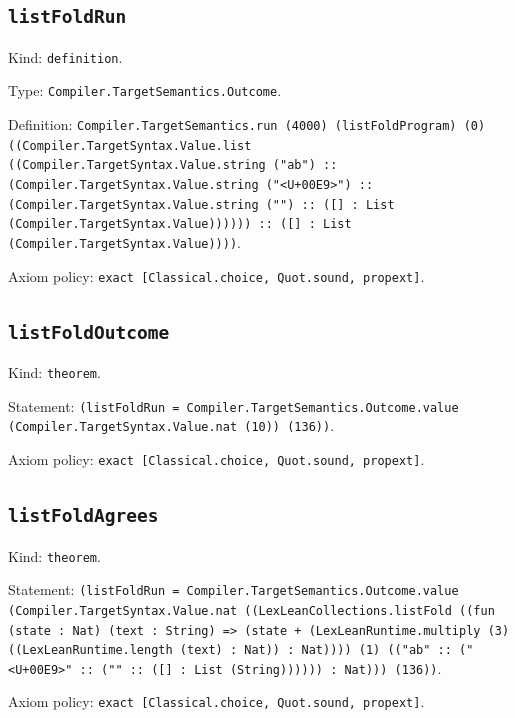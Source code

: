 \documentclass[11pt]{article}
\begin{document}
\subsection*{\texttt{listFoldRun}}
\noindent Kind: \texttt{definition}.\par
\noindent Type: \texttt{Compiler.TargetSemantics.Outcome}.\par
\noindent Definition: \texttt{Compiler.TargetSemantics.run (4000) (listFoldProgram) (0) ((Compiler.TargetSyntax.Value.list ((Compiler.TargetSyntax.Value.string ("ab") :: (Compiler.TargetSyntax.Value.string ("<U+00E9>") :: (Compiler.TargetSyntax.Value.string ("") :: ([] : List (Compiler.TargetSyntax.Value)))))) :: ([] : List (Compiler.TargetSyntax.Value))))}.\par
\noindent Axiom policy: \texttt{exact [Classical.choice, Quot.sound, propext]}.\par
\subsection*{\texttt{listFoldOutcome}}
\noindent Kind: \texttt{theorem}.\par
\noindent Statement: \texttt{(listFoldRun = Compiler.TargetSemantics.Outcome.value (Compiler.TargetSyntax.Value.nat (10)) (136))}.\par
\noindent Axiom policy: \texttt{exact [Classical.choice, Quot.sound, propext]}.\par
\subsection*{\texttt{listFoldAgrees}}
\noindent Kind: \texttt{theorem}.\par
\noindent Statement: \texttt{(listFoldRun = Compiler.TargetSemantics.Outcome.value (Compiler.TargetSyntax.Value.nat ((LexLeanCollections.listFold ((fun (state : Nat) (text : String) => (state + (LexLeanRuntime.multiply (3) ((LexLeanRuntime.length (text) : Nat)) : Nat)))) (1) (("ab" :: ("<U+00E9>" :: ("" :: ([] : List (String)))))) : Nat))) (136))}.\par
\noindent Axiom policy: \texttt{exact [Classical.choice, Quot.sound, propext]}.\par
\end{document}
